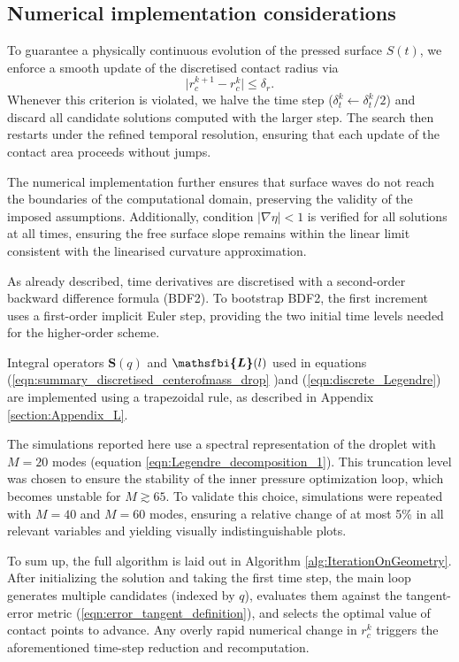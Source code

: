 \documentclass{jfm}
\newcommand{\bfjfm}[1]{\bm{\mathsfbi{#1}}}
\begin{document}
\subsection{Numerical implementation considerations}

To guarantee a physically continuous evolution of the pressed surface \(S(t)\), we enforce a smooth update of the discretised contact radius via
\[
\bigl\lvert r^{k+1}_c - r^{k}_c \bigr\rvert \le \delta_r.
\]
Whenever this criterion is violated, we halve the time step (\(\delta_t^k \leftarrow \delta_t^k/2\)) and discard all candidate solutions computed with the larger step.  The search then restarts under the refined temporal resolution, ensuring that each update of the contact area proceeds without jumps.

The numerical implementation further ensures that surface waves do not reach the boundaries of the computational domain, preserving the validity of the imposed assumptions. Additionally, condition \(|\nabla \eta| < 1\) is verified for all solutions at all times, ensuring the free surface slope remains within the linear limit consistent with the linearised curvature approximation.

As already described, time derivatives are discretised with a second-order backward difference formula (BDF2).  To bootstrap BDF2, the first increment uses a first-order implicit Euler step, providing the two initial time levels needed for the higher-order scheme.

Integral operators  $\mathbf{S}(q)$ and $\bfjfm{L}(l)$ used in equations (\ref{eqn:summary_discretised_centerofmass_drop} )and (\ref{eqn:discrete_Legendre})  are implemented using a trapezoidal rule, as described in Appendix \ref{section:Appendix_L}. 

The simulations reported here use a spectral representation of the droplet with \(M=20\) modes (equation \ref{eqn:Legendre_decomposition_1}). This truncation level was chosen to ensure the stability of the inner pressure optimization loop, which becomes unstable for \(M \gtrsim 65\). To validate this choice, simulations were repeated with \(M=40\) and \(M=60\) modes, ensuring a relative change of at most 5\% in all relevant variables and yielding visually indistinguishable plots.

To sum up, the full algorithm is laid out in Algorithm \ref{alg:IterationOnGeometry}.  After initializing the solution and taking the first time step, the main loop generates multiple candidates (indexed by \(q\)), evaluates them against the tangent-error metric (\ref{eqn:error_tangent_definition}), and selects the optimal value of contact points to advance.  Any overly rapid numerical change in \(r^k_c\) triggers the aforementioned time-step reduction and recomputation.




\end{document}
